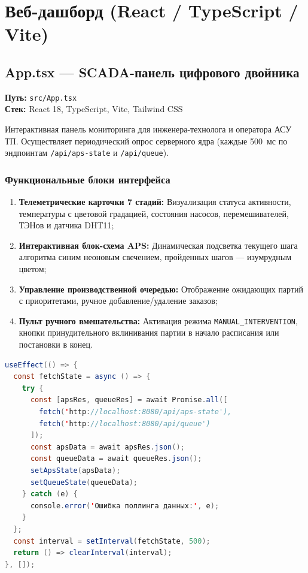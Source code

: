 \documentclass[14pt, a4paper]{extarticle}
\begin{document}
\newpage
\section{Веб-дашборд (React / TypeScript / Vite)}

\subsection{App.tsx --- SCADA-панель цифрового двойника}

\textbf{Путь:} \texttt{src/App.tsx}\\
\textbf{Стек:} React 18, TypeScript, Vite, Tailwind CSS

Интерактивная панель мониторинга для инженера-технолога и оператора АСУ ТП. Осуществляет периодический опрос серверного ядра (каждые 500~мс по эндпоинтам \texttt{/api/aps-state} и \texttt{/api/queue}).

\subsubsection{Функциональные блоки интерфейса}
\begin{enumerate}
    \item \textbf{Телеметрические карточки 7 стадий:} Визуализация статуса активности, температуры с цветовой градацией, состояния насосов, перемешивателей, ТЭНов и датчика DHT11;
    \item \textbf{Интерактивная блок-схема APS:} Динамическая подсветка текущего шага алгоритма синим неоновым свечением, пройденных шагов --- изумрудным цветом;
    \item \textbf{Управление производственной очередью:} Отображение ожидающих партий с приоритетами, ручное добавление/удаление заказов;
    \item \textbf{Пульт ручного вмешательства:} Активация режима \texttt{MANUAL\_INTERVENTION}, кнопки принудительного вклинивания партии в начало расписания или постановки в конец.
\end{enumerate}

\begin{lstlisting}[language=Java, caption=Фрагмент опроса и отображения стадий в App.tsx]
useEffect(() => {
  const fetchState = async () => {
    try {
      const [apsRes, queueRes] = await Promise.all([
        fetch('http://localhost:8080/api/aps-state'),
        fetch('http://localhost:8080/api/queue')
      ]);
      const apsData = await apsRes.json();
      const queueData = await queueRes.json();
      setApsState(apsData);
      setQueueState(queueData);
    } catch (e) {
      console.error('Ошибка поллинга данных:', e);
    }
  };
  const interval = setInterval(fetchState, 500);
  return () => clearInterval(interval);
}, []);
\end{lstlisting}
\end{document}
